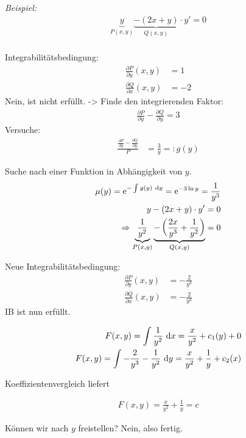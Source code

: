 \documentclass[main.tex]{subfiles}
\begin{document}
\textit{Beispiel:}
\begin{align*}
	\underbrace{y}_{P(x,y)} \underbrace{- (2x +y)}_{Q(x,y)} \cdot y' = 0 \\
\end{align*}

Integrabilitätsbedingung:
\begin{align*}
	\frac{\partial P}{\partial y}(x,y) &= 1 \\
	\frac{\partial Q}{\partial x}(x,y) &= -2 
\end{align*}
Nein, ist nicht erfüllt. 
-> Finde den integrierenden Faktor:
\begin{align*}
	\frac{\partial P}{\partial y} - \frac{\partial Q}{\partial y} = 3
\end{align*}
Versuche: 
\begin{align*}
	\frac{\frac{\partial P}{\partial y} - \frac{\partial Q}{\partial y}}{P} 
	&= \frac{3}{y} =: g(y)
\end{align*}

Suche nach einer Funktion in Abhängigkeit von $y$. 
\begin{align*}
	\mu(y) = \mathrm{e}^{-\int g(y)~\mathrm{d}y} = \mathrm{e}^{-3\ln y} = \frac{1}{y^3} \\
	y-(2x +y) \cdot y' = 0 \\
	\Rightarrow \underbrace{\frac{1}{y^2}}_{P(x,y)} \underbrace{ -\left(\frac{2x}{y^3} + \frac{1}{y^2} \right)}_{Q(x,y)} = 0
\end{align*}

Neue Integrabilitätsbedingung:
\begin{align*}
	\frac{\partial P}{\partial y}(x,y) &= - \frac{2}{y^3} \\
	\frac{\partial Q}{\partial x}(x,y) &= - \frac{2}{y^3} 
\end{align*}
IB ist nun erfüllt. 

\begin{align*}
	F(x,y) = \int \frac{1}{y^2} ~\mathrm{d}x = \frac{x}{y^2} + c_1(y) + 0\\
	F(x,y) = \int - \frac{2}{y^3} - \frac{1}{y^2} ~\mathrm{d}y = \frac{x}{y^2} + \frac{1}{y} + c_2(x)
\end{align*}

Koeffizientenvergleich liefert

\begin{align*}
	F(x,y) = \frac{x}{y^2} + \frac{1}{y} = c
\end{align*}

Können wir nach $y$ freistellen? Nein, also fertig. 
\end{document}

